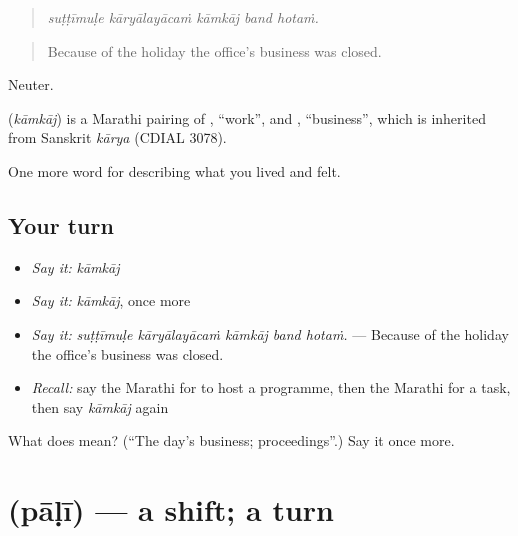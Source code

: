 \begin{quote}
\emph{suṭṭīmuḷe kāryālayācaṁ kāmkāj band hotaṁ.}
\end{quote}

\begin{quote}
Because of the holiday the office's business was closed.
\end{quote}

Neuter.

\begin{cousinweb}
\textbf{} (\emph{kāmkāj}) is a Marathi pairing of , \textquotedblleft{}work\textquotedblright{}, and , \textquotedblleft{}business\textquotedblright{}, which is inherited from Sanskrit \emph{kārya} (CDIAL 3078).
\end{cousinweb}

\begin{grammarlens}[title={What you've built}]
One more word for describing what you lived and felt.
\end{grammarlens}

\subsection*{Your turn}
\begin{itemize}
\raggedright
  \item \emph{Say it:} \emph{kāmkāj}
  \item \emph{Say it:} \emph{kāmkāj}, once more
  \item \emph{Say it:} \emph{suṭṭīmuḷe kāryālayācaṁ kāmkāj band hotaṁ.} — Because of the holiday the office's business was closed.
  \item \emph{Recall:} say the Marathi for to host a programme, then the Marathi for a task, then say \emph{kāmkāj} again
\end{itemize}

\begin{tcolorbox}[breakable,colback=teal!4,colframe=teal!35!black,title={Before you move on}]
What does  mean? (\textquotedblleft{}The day's business; proceedings\textquotedblright{}.) Say it once more.
\end{tcolorbox}
\section[\texorpdfstring{\mr{पाळी} (pāḷī)}{पाळी (pāḷī)}]{ (pāḷī) — a shift; a turn}

\label{lesson:MR-C514-pali}



